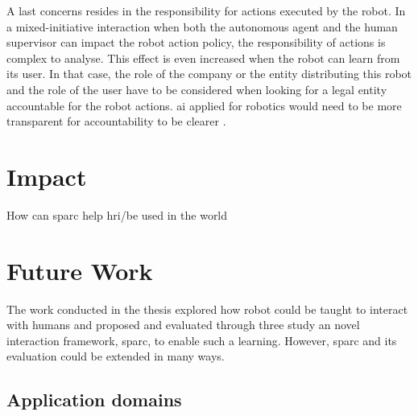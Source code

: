 A last concerns resides in the responsibility for actions executed by the robot. In a mixed-initiative interaction when both the autonomous agent and the human supervisor can impact the robot action policy, the responsibility of actions is complex to analyse. This effect is even increased when the robot can learn from its user. In that case, the role of the company or the entity distributing this robot and the role of the user have to be considered when looking for a legal entity accountable for the robot actions. \gls{ai} applied for robotics would need to be more transparent for accountability to be clearer \citep{wachter2017transparent}.

\section{Impact}

How can sparc help hri/be used in the world

\section{Future Work}

The work conducted in the thesis explored how robot could be taught to interact with humans and proposed and evaluated through three study an novel interaction framework, \gls{sparc}, to enable such a learning. However, \gls{sparc} and its evaluation could be extended in many ways.

\subsection{Application domains}

